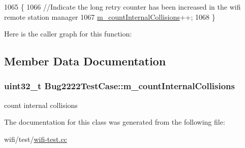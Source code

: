 \begin{DoxyCode}
1065 \{
1066   \textcolor{comment}{//Indicate the long retry counter has been increased in the wifi remote station manager}
1067   \hyperlink{classBug2222TestCase_a0459c1e5f762d2ef06af67617cb4fb5f}{m\_countInternalCollisions}++;
1068 \}
\end{DoxyCode}


Here is the caller graph for this function\+:




\subsection{Member Data Documentation}
\subsubsection[{\texorpdfstring{m\+\_\+count\+Internal\+Collisions}{m_countInternalCollisions}}]{\setlength{\rightskip}{0pt plus 5cm}uint32\+\_\+t Bug2222\+Test\+Case\+::m\+\_\+count\+Internal\+Collisions\hspace{0.3cm}{\ttfamily [private]}}\hypertarget{classBug2222TestCase_a0459c1e5f762d2ef06af67617cb4fb5f}{}\label{classBug2222TestCase_a0459c1e5f762d2ef06af67617cb4fb5f}


count internal collisions 



The documentation for this class was generated from the following file\+:\begin{DoxyCompactItemize}
\item 
wifi/test/\hyperlink{wifi-test_8cc}{wifi-\/test.\+cc}\end{DoxyCompactItemize}
